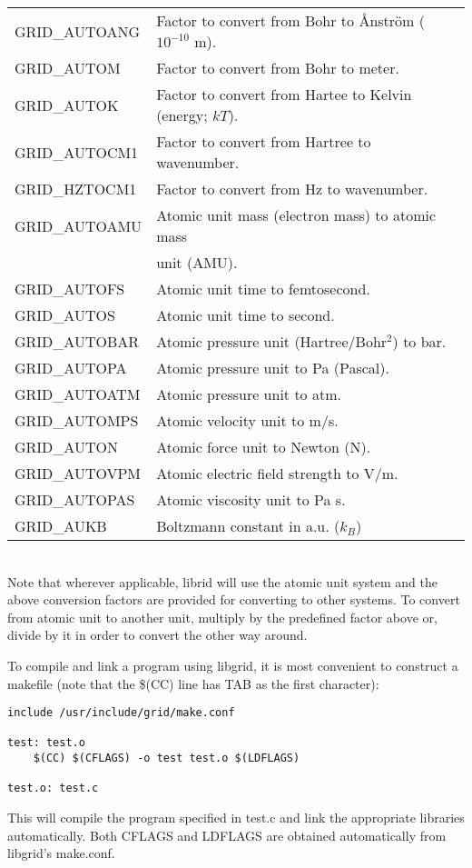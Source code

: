 \documentclass[12pt,letterpaper]{article}
\begin{document}
\begin{tabular}{ll}
GRID\_AUTOANG & Factor to convert from Bohr to \AA{}nstr\"om ($10^{-10}$ m).\\
GRID\_AUTOM & Factor to convert from Bohr to meter.\\
GRID\_AUTOK & Factor to convert from Hartee to Kelvin (energy; $kT$).\\
GRID\_AUTOCM1 & Factor to convert from Hartree to wavenumber.\\
GRID\_HZTOCM1 & Factor to convert from Hz to wavenumber.\\
GRID\_AUTOAMU & Atomic unit mass (electron mass) to atomic mass\\
              & unit (AMU).\\
GRID\_AUTOFS & Atomic unit time to femtosecond.\\
GRID\_AUTOS  & Atomic unit time to second.\\
GRID\_AUTOBAR & Atomic pressure unit (Hartree/Bohr$^2$) to bar.\\
GRID\_AUTOPA & Atomic pressure unit to Pa (Pascal).\\
GRID\_AUTOATM & Atomic pressure unit to atm.\\
GRID\_AUTOMPS & Atomic velocity unit to m/s.\\
GRID\_AUTON & Atomic force unit to Newton (N).\\
GRID\_AUTOVPM & Atomic electric field strength to V/m.\\
GRID\_AUTOPAS & Atomic viscosity unit to Pa s.\\
GRID\_AUKB & Boltzmann constant in a.u. ($k_B$)\\ 
\end{tabular}\\

\noindent
Note that wherever applicable, librid will use the atomic unit system and the above conversion factors are provided for converting to other systems. To convert from atomic unit to another unit, multiply by the predefined factor above or, divide by it in order to convert the other way around.

To compile and link a program using libgrid, it is most convenient to construct a makefile (note that the \$(CC) line has TAB as the first character):
\begin{verbatim}
include /usr/include/grid/make.conf

test: test.o
    $(CC) $(CFLAGS) -o test test.o $(LDFLAGS)

test.o: test.c
\end{verbatim}
This will compile the program specified in test.c and link the appropriate libraries automatically. Both CFLAGS and LDFLAGS are obtained automatically from libgrid's make.conf. 
\end{document}
